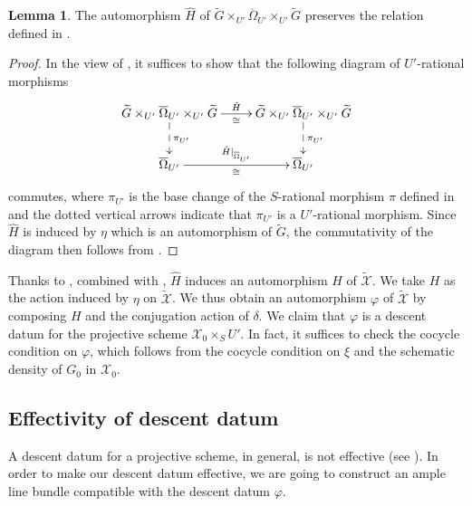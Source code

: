 \documentclass[11pt, reqno]{amsart}
\theoremstyle{plain}
\theoremstyle{definition}
\newtheorem{lemma}[theorem]{Lemma}
\begin{document}
\begin{lemma}\label{outmorphismpreserverelation}
    The automorphism $\hat{H}$ of   $\widetilde{G} \times_{U'}\overline{\Omega}_{U'}\times_{U'} \widetilde{G}$ preserves the relation defined in .
\end{lemma}

\begin{proof}
    In the view of , it suffices to show that the following diagram of $U'$-rational morphisms
    $$\xymatrix{
\widetilde{G}\times_{U'}\overline{\Omega}_{U'}\times_{U'} \widetilde{G} \ar[r]^{\hat{H}}_{\cong}\ar@{-->}[d]^{\pi_{U'}}  &  \widetilde{G}\times_{U'}\overline{\Omega}_{U'}\times_{U'} \widetilde{G}\ar@{-->}[d]^{\pi_{U'}}\\
\overline{\Omega}_{U'}\ar[r]_{\cong}^{\hat{H}\vert_{\overline{\Omega}_{U'}}} &\overline{\Omega}_{U'}
    }$$
    commutes, where $\pi_{U'}$ is the base change of the $S$-rational morphism $\pi$ defined in  and the dotted vertical arrows indicate that $\pi_{U'}$ is a $U'$-rational morphism.
    Since $\hat{H}$ is induced by $\eta$ which is an automorphism of $\widetilde{G}$, the commutativity of the diagram then follows from .
\end{proof}

Thanks to  , combined with , $\hat{H}$ induces an automorphism $H$ of $\widetilde{\mathcal{X}}$. We take $H$ as the  action induced by $\eta$ on $\widetilde{\mathcal{X}}$. We thus obtain an automorphism $\varphi$ of $\widetilde{\mathcal{X}}$ by composing $H$ and the conjugation action of $\delta$. We claim that $\varphi$ is a descent datum for the projective scheme $\mathcal{X}_0\times_S U'$. In fact, it suffices to check the cocycle condition on $\varphi$, which follows from the cocycle condition on $\xi$ and the schematic density of $G_0$ in $\mathcal{X}_0$. 

\subsection{Effectivity of descent datum}
A descent datum for a projective scheme, in general, is not effective (see \cite[08KE]{stacks-project}). In order to make our descent datum effective, we are going to construct an ample line bundle compatible with the descent datum $\varphi$. 
\end{document}
